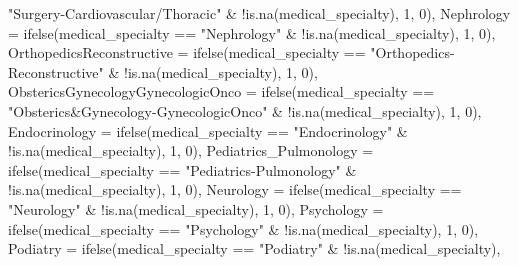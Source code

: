 \documentclass[
]{article}
\newenvironment{Shaded}{\begin{snugshade}}{\end{snugshade}}
\newcommand{\AttributeTok}[1]{\textcolor[rgb]{0.77,0.63,0.00}{#1}}
\newcommand{\DecValTok}[1]{\textcolor[rgb]{0.00,0.00,0.81}{#1}}
\newcommand{\FunctionTok}[1]{\textcolor[rgb]{0.00,0.00,0.00}{#1}}
\newcommand{\NormalTok}[1]{#1}
\newcommand{\SpecialCharTok}[1]{\textcolor[rgb]{0.00,0.00,0.00}{#1}}
\newcommand{\StringTok}[1]{\textcolor[rgb]{0.31,0.60,0.02}{#1}}
\begin{document}
\begin{Shaded}
\begin{Highlighting}[]
            \StringTok{"Surgery{-}Cardiovascular/Thoracic"} \SpecialCharTok{\&} \SpecialCharTok{!}\FunctionTok{is.na}\NormalTok{(medical\_specialty),}
            \DecValTok{1}\NormalTok{, }\DecValTok{0}\NormalTok{), }\AttributeTok{Nephrology =} \FunctionTok{ifelse}\NormalTok{(medical\_specialty }\SpecialCharTok{==}
            \StringTok{"Nephrology"} \SpecialCharTok{\&} \SpecialCharTok{!}\FunctionTok{is.na}\NormalTok{(medical\_specialty),}
            \DecValTok{1}\NormalTok{, }\DecValTok{0}\NormalTok{), }\AttributeTok{OrthopedicsReconstructive =} \FunctionTok{ifelse}\NormalTok{(medical\_specialty }\SpecialCharTok{==}
            \StringTok{"Orthopedics{-}Reconstructive"} \SpecialCharTok{\&} \SpecialCharTok{!}\FunctionTok{is.na}\NormalTok{(medical\_specialty),}
            \DecValTok{1}\NormalTok{, }\DecValTok{0}\NormalTok{), }\AttributeTok{ObstericsGynecologyGynecologicOnco =} \FunctionTok{ifelse}\NormalTok{(medical\_specialty }\SpecialCharTok{==}
            \StringTok{"Obsterics\&Gynecology{-}GynecologicOnco"} \SpecialCharTok{\&}
            \SpecialCharTok{!}\FunctionTok{is.na}\NormalTok{(medical\_specialty), }\DecValTok{1}\NormalTok{, }\DecValTok{0}\NormalTok{), }\AttributeTok{Endocrinology =} \FunctionTok{ifelse}\NormalTok{(medical\_specialty }\SpecialCharTok{==}
            \StringTok{"Endocrinology"} \SpecialCharTok{\&} \SpecialCharTok{!}\FunctionTok{is.na}\NormalTok{(medical\_specialty),}
            \DecValTok{1}\NormalTok{, }\DecValTok{0}\NormalTok{), }\AttributeTok{Pediatrics\_Pulmonology =} \FunctionTok{ifelse}\NormalTok{(medical\_specialty }\SpecialCharTok{==}
            \StringTok{"Pediatrics{-}Pulmonology"} \SpecialCharTok{\&} \SpecialCharTok{!}\FunctionTok{is.na}\NormalTok{(medical\_specialty),}
            \DecValTok{1}\NormalTok{, }\DecValTok{0}\NormalTok{), }\AttributeTok{Neurology =} \FunctionTok{ifelse}\NormalTok{(medical\_specialty }\SpecialCharTok{==}
            \StringTok{"Neurology"} \SpecialCharTok{\&} \SpecialCharTok{!}\FunctionTok{is.na}\NormalTok{(medical\_specialty),}
            \DecValTok{1}\NormalTok{, }\DecValTok{0}\NormalTok{), }\AttributeTok{Psychology =} \FunctionTok{ifelse}\NormalTok{(medical\_specialty }\SpecialCharTok{==}
            \StringTok{"Psychology"} \SpecialCharTok{\&} \SpecialCharTok{!}\FunctionTok{is.na}\NormalTok{(medical\_specialty),}
            \DecValTok{1}\NormalTok{, }\DecValTok{0}\NormalTok{), }\AttributeTok{Podiatry =} \FunctionTok{ifelse}\NormalTok{(medical\_specialty }\SpecialCharTok{==}
            \StringTok{"Podiatry"} \SpecialCharTok{\&} \SpecialCharTok{!}\FunctionTok{is.na}\NormalTok{(medical\_specialty),}

\end{Highlighting}
\end{Shaded}
\end{document}
